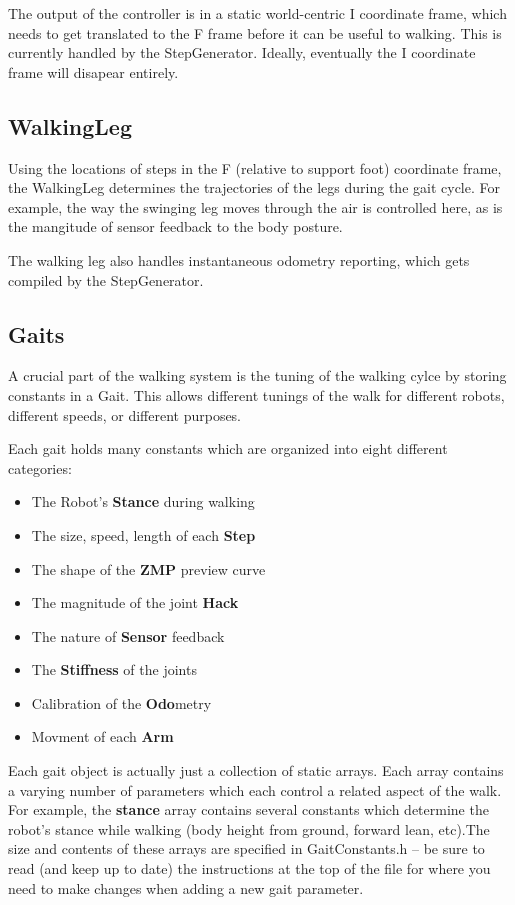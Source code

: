 \documentclass[11pt]{article}
\begin{document}
The output of the controller is in a static world-centric I coordinate frame,
which needs to get translated to the F frame before it can be useful to walking.
This is currently handled by the StepGenerator. Ideally, eventually the I
coordinate frame will disapear entirely.

\subsection{WalkingLeg}
Using the locations of steps in the F (relative to support foot) coordinate
frame, the WalkingLeg determines the trajectories of the legs during the gait
cycle. For example, the way the swinging leg moves through the air is controlled
here, as is the mangitude of sensor feedback to the body posture.

The walking leg also handles instantaneous odometry reporting, which gets
compiled by the StepGenerator.

\subsection{Gaits}
A crucial part of the walking system is the tuning of the walking cylce by
storing constants in a Gait. This allows different tunings of the walk for
different robots, different speeds, or different purposes.

Each gait holds many constants which are organized into eight
different categories:

\begin{itemize}
\item The Robot's {\bf Stance} during walking
\item The size, speed, length of each {\bf Step}
\item The shape of the {\bf ZMP} preview curve
\item The magnitude of the joint {\bf Hack}
\item The nature of {\bf Sensor} feedback
\item The {\bf Stiffness} of the joints
\item Calibration of the {\bf Odo}metry
\item Movment of each {\bf Arm}
\end{itemize}

Each gait object is actually just a collection of static arrays. Each array
contains a varying number of parameters which each control a related aspect
of the walk. For example, the {\bf stance} array contains several constants
which determine the robot's stance while walking (body height from ground,
forward lean, etc).The size and
contents of these arrays are specified in GaitConstants.h -- be sure to read
(and keep up to date) the instructions at the top of the file for where you
need to make changes when adding a new gait parameter.
\end{document}
